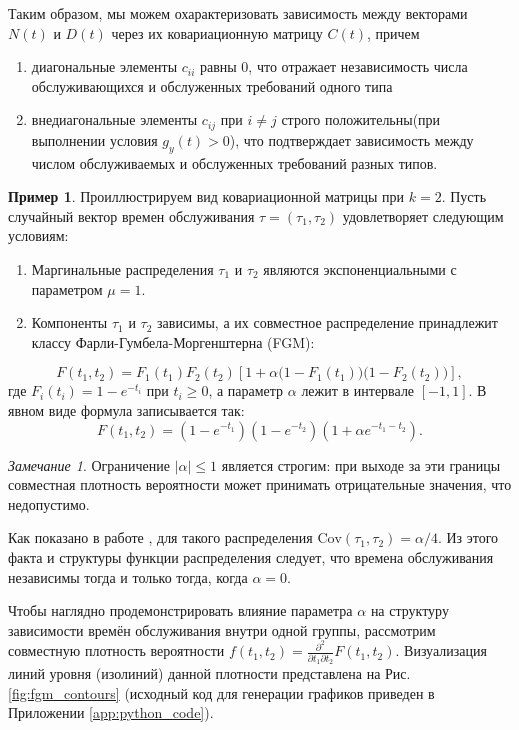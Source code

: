 \documentclass[12pt]{article}
\theoremstyle{plain}
\theoremstyle{definition}
\newtheorem{example}{Пример}[section]
\theoremstyle{remark}
\newtheorem{remark}{Замечание}[section]
\begin{document}
Таким образом, мы можем охарактеризовать зависимость между векторами $N(t)$ и $D(t)$ через их ковариационную матрицу $C(t)$, причем
\begin{enumerate}
    \item диагональные элементы $c_{ii}$ равны 0, что отражает независимость числа обслуживающихся и обслуженных требований одного типа
    \item внедиагональные элементы $c_{ij}$ при $i \not = j$ строго положительны(при выполнении условия $g_y(t) > 0$), что подтверждает зависимость между числом обслуживаемых и обслуженных требований разных типов. 
\end{enumerate}

\begin{example}
Проиллюстрируем вид ковариационной матрицы при $k=2$. Пусть случайный вектор времен обслуживания $\tau = (\tau_1, \tau_2)$ удовлетворяет следующим условиям:
\begin{enumerate}
    \item Маргинальные распределения $\tau_1$ и $\tau_2$ являются экспоненциальными с параметром $\mu = 1$.
    \item Компоненты $\tau_1$ и $\tau_2$ зависимы, а их совместное распределение принадлежит классу Фарли-Гумбела-Моргенштерна (FGM):
\end{enumerate}
\[
    F(t_1, t_2) = F_1(t_1) F_2(t_2) \left[1 + \alpha \big(1-F_1(t_1)\big)\big(1-F_2(t_2)\big)\right],
\]
где $F_i(t_i) = 1 - e^{-t_i}$ при $t_i \ge 0$, а параметр $\alpha$ лежит в интервале $[-1, 1]$. 
В явном виде формула записывается так:
\[
    F(t_1, t_2) = (1- e^{-t_1})(1 - e^{-t_2}) \left(1 + \alpha e^{-t_1 - t_2}\right).
\]

\begin{remark}
Ограничение $|\alpha| \le 1$ является строгим: при выходе за эти границы совместная плотность вероятности может принимать отрицательные значения, что недопустимо.
\end{remark}

Как показано в работе \cite{Gumbel}, для такого распределения $\mathrm{Cov}(\tau_1, \tau_2) = \alpha/4$. Из этого факта и структуры функции распределения следует, что времена обслуживания независимы тогда и только тогда, когда $\alpha = 0$.

Чтобы наглядно продемонстрировать влияние параметра $\alpha$ на структуру зависимости времён обслуживания внутри одной группы, рассмотрим совместную плотность вероятности $f(t_1, t_2) = \frac{\partial^2}{\partial t_1 \partial t_2} F(t_1, t_2)$. Визуализация линий уровня (изолиний) данной плотности представлена на Рис. \ref{fig:fgm_contours} (исходный код для генерации графиков приведен в Приложении \ref{app:python_code}).


\end{example}
\end{document}
